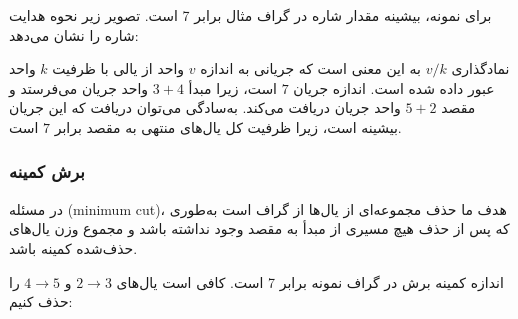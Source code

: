 برای نمونه، بیشینه مقدار شاره
در گراف مثال برابر 7 است.
تصویر زیر نحوه هدایت شاره را نشان می‌دهد:

\begin{center}
\end{center}

نمادگذاری $v/k$ به این معنی است
که جریانی به اندازه $v$ واحد از
یالی با ظرفیت $k$ واحد عبور داده شده است.
اندازه جریان $7$ است،
زیرا مبدأ $3+4$ واحد جریان می‌فرستد
و مقصد $5+2$ واحد جریان دریافت می‌کند.
به‌سادگی می‌توان دریافت که این جریان بیشینه است،
زیرا ظرفیت کل یال‌های
منتهی به مقصد برابر $7$ است.

\subsubsection{برش کمینه}


در مسئله  (minimum cut)،
هدف ما حذف مجموعه‌ای
از یال‌ها از گراف است
به‌طوری که پس از حذف هیچ مسیری از مبدأ
به مقصد وجود نداشته باشد
و مجموع وزن یال‌های حذف‌شده
کمینه باشد.

اندازه کمینه برش در گراف نمونه برابر 7 است.
کافی است یال‌های $2 \rightarrow 3$
و $4 \rightarrow 5$ را حذف کنیم:

